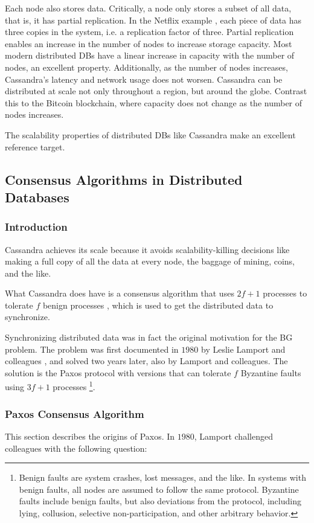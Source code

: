 Each node also stores data.
Critically, a node only stores a subset of all data, that is, it has partial replication.
In the Netflix example \cite{kalantzis_netflix}, each piece of data has three copies in the system, i.e. a replication factor of three.
Partial replication enables an increase in the number of nodes to increase storage capacity.
Most modern distributed DBs have a linear increase in capacity with the number of nodes, an excellent property.
Additionally, as the number of nodes increases, Cassandra’s latency and network usage does not worsen.
Cassandra can be distributed at scale not only throughout a region, but around the globe.
Contrast this to the Bitcoin blockchain, where capacity does not change as the number of nodes increases.

The scalability properties of distributed DBs like Cassandra make an excellent reference target.

\subsection{Consensus Algorithms in Distributed Databases}
\subsubsection{Introduction}
Cassandra achieves its scale because it avoids scalability-killing decisions like making a full copy of all the data at every node, the baggage of mining, coins, and the like.

What Cassandra does have is a consensus algorithm that uses $2f+1$ processes to tolerate $f$ benign processes \cite{lamport1998part}, which is used to get the distributed data to synchronize.

Synchronizing distributed data was in fact the original motivation for the BG problem.
The problem was first documented in $1980$ by Leslie Lamport and colleagues \cite{pease1980reaching}, and solved two years later, also by Lamport and colleagues.
The solution is the Paxos protocol \cite{lamport1982byzantine} with versions that can tolerate $f$ Byzantine faults using $3f+1$ processes \cite{lamport2011byzantizing, castro2001byzantine}\footnote{Benign faults are system crashes, lost messages, and the like. In systems with benign faults, all nodes are assumed to follow the same protocol.
Byzantine faults include benign faults, but also deviations from the protocol, including lying, collusion, selective non-participation, and other arbitrary behavior.}.

\subsubsection{Paxos Consensus Algorithm}\label{subsec:distributed:paxos}
This section describes the origins of Paxos.
In $1980$, Lamport challenged colleagues with the following question:  \cite{lamport_writings}


